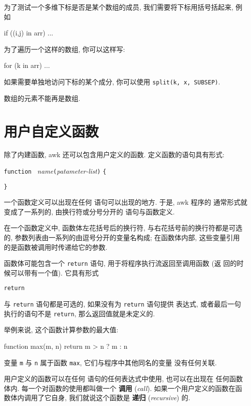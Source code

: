 为了测试一个多维下标是否是某个数组的成员, 我们需要将下标用括号括起来, 例如 
\begin{awkcode}
    if ((i,j) in arr) ...
\end{awkcode}
为了遍历一个这样的数组, 你可以这样写:
\begin{awkcode}
    for (k in arr) ...
\end{awkcode}
如果需要单独地访问下标的某个成分, 你可以使用 \verb'split(k, x, SUBSEP)'.

数组的元素不能再是数组.

\section{用户自定义函数}
\label{sec:user_defined_functions}

除了内建函数, awk 还可以包含用户定义的函数. 定义函数的语句具有形式:
\begin{pattern}
    \verb'function ' \textit{name}\verb'('\textit{patameter-list}\verb')'
        \verb'{' \par
            \indent\indent\stmt \par
        \verb'}'
\end{pattern}
一个函数定义可以出现在任何 \patact 语句可以出现的地方. 于是, awk 程序的 
通常形式就变成了一系列的, 由换行符或分号分开的 \patact 语句与函数定义.

在一个函数定义中, 函数体左花括号后的换行符, 与右花括号前的换行符都是可选
的, 参数列表由一系列的由逗号分开的变量名构成; 在函数体内部, 这些变量引用
的是函数被调用时传递给它的参数.

函数体可能包含一个 \verb'return' 语句, 用于将程序执行流返回至调用函数 (返
回的时候可以带有一个值). 它具有形式
\begin{pattern}
    \verb'return '\expr
\end{pattern}
\expr 与 \verb'return' 语句都是可选的, 如果没有为 \verb'return' 语句提供 
表达式, 或者最后一句执行的语句不是 \verb'return', 那么返回值就是未定义的.

举例来说, 这个函数计算参数的最大值:
\begin{awkcode}
    function max(m, n) {
        return m > n ? m : n
    }
\end{awkcode}
变量 \verb'm' 与 \verb'n' 属于函数 \verb'max', 它们与程序中其他同名的变量
没有任何关联.

用户定义的函数可以在任何 \patact 语句的任何表达式中使用, 也可以在出现在
任何函数体内. 每一个对函数的使用都叫做一个 \textbf{调用} (\emph{call}).
如果一个用户定义的函数在函数体内调用了它自身, 
我们就说这个函数是 \textbf{递归}
(\emph{recursive}) 的.

